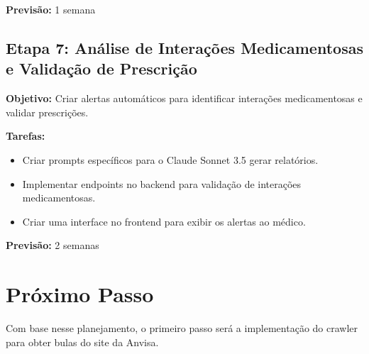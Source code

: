 \textbf{Previsão:} 1 semana

\subsection{Etapa 7: Análise de Interações Medicamentosas e Validação de Prescrição}

\textbf{Objetivo:} Criar alertas automáticos para identificar interações medicamentosas e validar prescrições.

\textbf{Tarefas:}
\begin{itemize}
    \item Criar prompts específicos para o Claude Sonnet 3.5 gerar relatórios.
    \item Implementar endpoints no backend para validação de interações medicamentosas.
    \item Criar uma interface no frontend para exibir os alertas ao médico.
\end{itemize}

\textbf{Previsão:} 2 semanas

\section{Próximo Passo}

Com base nesse planejamento, o primeiro passo será a implementação do crawler para obter bulas do site da Anvisa.